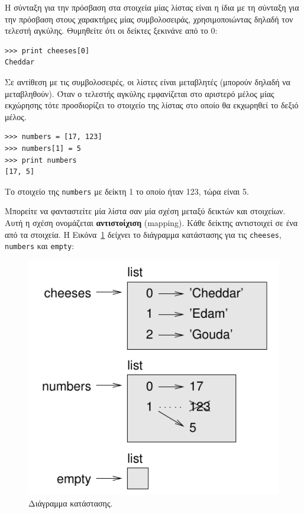 \documentclass[10pt]{book}
\begin{document}
Η σύνταξη για την πρόσβαση στα στοιχεία μίας λίστας είναι η ίδια με τη σύνταξη για την πρόσβαση στους χαρακτήρες μίας συμβολοσειράς, χρησιμοποιώντας δηλαδή τον τελεστή αγκύλης. Θυμηθείτε ότι οι δείκτες ξεκινάνε από το 0:

\begin{verbatim}
>>> print cheeses[0]
Cheddar
\end{verbatim}
%

Σε αντίθεση με τις συμβολοσειρές, οι λίστες είναι μεταβλητές (μπορούν δηλαδή να μεταβληθούν). Όταν ο τελεστής αγκύλης εμφανίζεται στο αριστερό μέλος μίας εκχώρησης τότε προσδιορίζει το στοιχείο της λίστας στο οποίο θα εκχωρηθεί το δεξιό μέλος.

\begin{verbatim}
>>> numbers = [17, 123]
>>> numbers[1] = 5
>>> print numbers
[17, 5]
\end{verbatim}
%

Το στοιχείο της {\tt numbers} με δείκτη 1 το οποίο ήταν 123, τώρα είναι 5.

Μπορείτε να φανταστείτε μία λίστα σαν μία σχέση μεταξύ δεικτών και στοιχείων. Αυτή η σχέση ονομάζεται {\bf αντιστοίχιση} (mapping). Κάθε δείκτης αντιστοιχεί σε ένα από τα στοιχεία. Η Εικόνα~\ref{fig.liststate} δείχνει το διάγραμμα κατάστασης για τις {\tt cheeses}, {\tt numbers} και {\tt empty}:

\begin{figure}
\centerline
{\includegraphics[scale=0.8]{figs/liststate.pdf}}
\caption{Διάγραμμα κατάστασης.}
\label{fig.liststate}
\end{figure}
\end{document}
